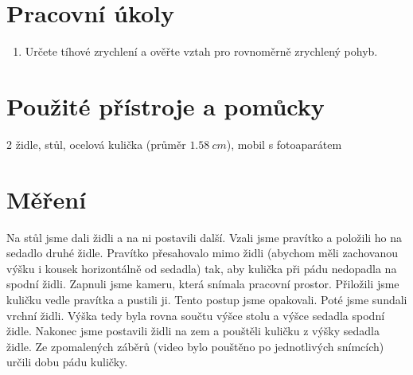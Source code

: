 \section{Pracovní úkoly}

\begin{enumerate}
	
	
	\item Určete tíhové zrychlení a ověřte vztah pro rovnoměrně zrychlený pohyb.
	
\end{enumerate}



\section{Použité přístroje a pomůcky}
2 židle, stůl, ocelová kulička (průměr $1.58~cm$), mobil s fotoaparátem



\section{Měření}
Na stůl jsme dali židli a na ni postavili další. Vzali jsme pravítko a položili ho na sedadlo druhé židle. Pravítko přesahovalo mimo židli (abychom měli zachovanou výšku i kousek horizontálně od sedadla) tak, aby kulička při pádu nedopadla na spodní židli. Zapnuli jsme kameru, která snímala pracovní prostor. Přiložili jsme kuličku vedle pravítka a pustili ji. Tento postup jsme opakovali. Poté jsme sundali vrchní židli. Výška tedy byla rovna součtu výšce stolu a výšce sedadla spodní židle. Nakonec jsme postavili židli na zem a pouštěli kuličku z výšky sedadla židle. Ze zpomalených záběrů (video bylo pouštěno po jednotlivých snímcích) určili dobu pádu kuličky. 

